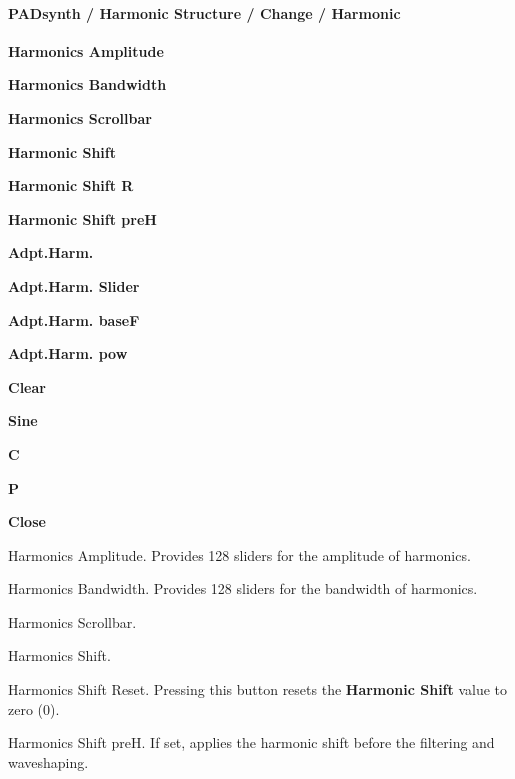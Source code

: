 \paragraph{PADsynth / Harmonic Structure / Change / Harmonic}
\label{paragraph:padsynth_harmonic_structure_change_harmonic}

   \begin{enumber}
      \item \textbf{Harmonics Amplitude}
      \item \textbf{Harmonics Bandwidth}
      \item \textbf{Harmonics Scrollbar}
      \item \textbf{Harmonic Shift}
      \item \textbf{Harmonic Shift R}
      \item \textbf{Harmonic Shift preH}
      \item \textbf{Adpt.Harm.}
      \item \textbf{Adpt.Harm. Slider}
      \item \textbf{Adpt.Harm. baseF}
      \item \textbf{Adpt.Harm. pow}
      \item \textbf{Clear}
      \item \textbf{Sine}
      \item \textbf{C}
      \item \textbf{P}
      \item \textbf{Close}
   \end{enumber}

   Harmonics Amplitude.
   Provides 128 sliders for the amplitude of harmonics.

   Harmonics Bandwidth.
   Provides 128 sliders for the bandwidth of harmonics.

   Harmonics Scrollbar.

   Harmonics Shift.

   Harmonics Shift Reset.
   Pressing this button resets the \textbf{Harmonic Shift} value to zero
   (0).

   Harmonics Shift preH.
   If set, applies the harmonic shift before the filtering and waveshaping.

